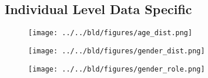 \documentclass[11pt, a4paper, leqno]{article}
\begin{document}
\subsection{Individual Level Data Specific}
\begin{footnotesize}
\begin{center}

\end{center}
\end{footnotesize}

\begin{figure}[!htb]
    \centerline{\texttt{[image: ../../bld/figures/age\_dist.png]}}
    \caption{\label{fig:1}}
    \end{figure}


\begin{figure}[h!]
    \centerline{\texttt{[image: ../../bld/figures/gender\_dist.png]}}
    \caption{\label{fig:2}}
    \end{figure}

\begin{figure}[h!]
    \centerline{\texttt{[image: ../../bld/figures/gender\_role.png]}}
    \caption{\label{fig:3}}
    \end{figure}











\end{document}

